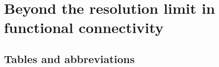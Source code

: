 \chapter{Beyond the resolution limit in functional connectivity}



%






\begin{appendices}
\chapter{Tables and abbreviations}


\end{appendices}

%
